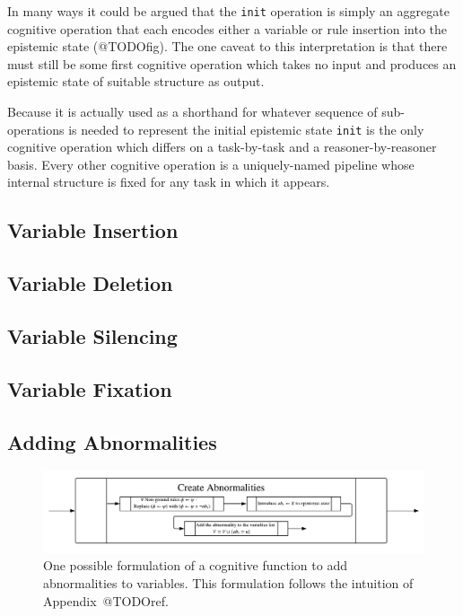 \documentclass[
11pt, %
english, %
singlespacing, %
headsepline, %
]{MastersDoctoralThesis} %
\begin{document}
In many ways it could be argued that the \texttt{init} operation is simply an aggregate cognitive operation that each encodes either a variable or rule insertion into the epistemic state (@TODOfig). The one caveat to this interpretation is that there must still be some first cognitive operation which takes no input and produces an epistemic state of suitable structure as output.

Because it is actually used as a shorthand for whatever sequence of sub-operations is needed to represent the initial epistemic state \texttt{init} is the only cognitive operation which differs on a task-by-task and a reasoner-by-reasoner basis. Every other cognitive operation is a uniquely-named pipeline whose internal structure is fixed for any task in which it appears.

\subsection{Variable Insertion}


\subsection{Variable Deletion}
\subsection{Variable Silencing}
\subsection{Variable Fixation}
\subsection{Adding Abnormalities}
\begin{figure} 
\begin{center}
\includegraphics[width=\linewidth]{abnormalitySCP}
\end{center}
\caption{One possible formulation of a cognitive function to add abnormalities to variables. This formulation follows the intuition of Appendix~@TODOref.}
\label{fig:addAB}
\end{figure}
\end{document}
